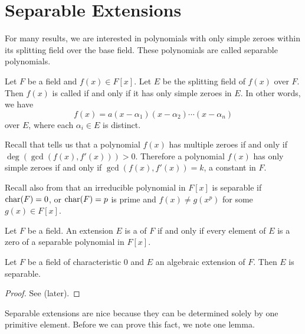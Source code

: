 \section{Separable Extensions}
For many results, we are interested in polynomials with only simple zeroes within its splitting field over the base field. These polynomials are called separable polynomials.

\begin{definition}
    Let $F$ be a field and $f(x) \in F[x]$. Let $E$ be the splitting field of $f(x)$ over $F$. Then $f(x)$ is called  if and only if it has only simple zeroes in $E$. In other words, we have
    \[
        f(x) = a(x-\alpha_1)(x-\alpha_2)\cdots(x-\alpha_n)
    \]
    over $E$, where each $\alpha_i \in E$ is distinct.
\end{definition}

Recall that  tells us that a polynomial $f(x)$ has multiple zeroes if and only if $\deg(\gcd(f(x), f'(x))) > 0$. Therefore a polynomial $f(x)$ has only simple zeroes if and only if $\gcd(f(x), f'(x)) = k$, a constant in $F$.

Recall also from  that an irreducible polynomial in $F[x]$ is separable if $\mathrm{char}(F) = 0$, or $\mathrm{char}(F) = p$ is prime and $f(x) \neq g(x^p)$ for some $g(x) \in F[x]$.

\begin{definition}
    Let $F$ be a field. An extension $E$ is a  of $F$ if and only if every element of $E$ is a zero of a separable polynomial in $F[x]$.
\end{definition}

\begin{proposition}\label{prop-algebraic-extension-of-field-of-characteristic-0-is-separable}
    Let $F$ be a field of characteristic 0 and $E$ an algebraic extension of $F$. Then $E$ is separable.
\end{proposition}
\begin{proof}
    See  (later).
\end{proof}



Separable extensions are nice because they can be determined solely by one primitive element. Before we can prove this fact, we note one lemma.


